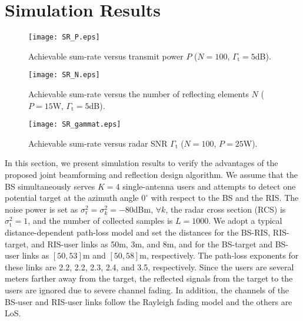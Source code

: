 \documentclass[Conference,a4paper]{IEEEtran}
\begin{document}
\section{Simulation Results}


\begin{figure*}[!t]
\centering
\begin{minipage}[t]{0.325\textwidth}\centering\setcaptionwidth{2in}
\texttt{[image: SR\_P.eps]}
\caption{Achievable sum-rate versus transmit power $P$ ($N = 100$, $\Gamma_\text{t}=5$dB).}
\end{minipage}
\begin{minipage}[t]{0.325\textwidth}
\texttt{[image: SR\_N.eps]}\centering\setcaptionwidth{2in}
\caption{Achievable sum-rate versus the number of reflecting elements $N$ ($P = 15$W, $\Gamma_\text{t} = 5$dB).}
\end{minipage}
\begin{minipage}[t]{0.325\textwidth}\centering\setcaptionwidth{2in}
\texttt{[image: SR\_gammat.eps]}
\caption{Achievable sum-rate versus radar SNR $\Gamma_\text{t}$ ($N = 100$, $P = 25$W).}
\end{minipage}\vspace{0.1 cm}
\end{figure*}


In this section, we present simulation results to verify the advantages of the proposed joint beamforming and reflection design algorithm.
We assume that the BS simultaneously serves $K = 4$ single-antenna users and attempts to detect one potential target at the azimuth angle $0^\circ$ with respect to the BS and the RIS.
The noise power is set as $\sigma_\text{r}^2 = \sigma_k^2 = -80$dBm, $\forall k$, the radar cross section (RCS) is $\sigma_\text{t}^2 = 1$, and the number of collected samples is $L = 1000$.
We adopt a typical distance-dependent path-loss model \cite{Wu-TWC-2019} and set the distances for the BS-RIS, RIS-target, and RIS-user links as 50m, 3m, and 8m, and for the BS-target and BS-user links as $[50,53]$m and $[50,58]$m, respectively.
The path-loss exponents for these links are 2.2, 2.2, 2.3, 2.4, and 3.5, respectively.
Since the users are several meters farther away from the target, the reflected signals from the target to the users are ignored due to severe channel fading.
In addition, the channels of the BS-user and RIS-user links follow the Rayleigh fading model and the others are LoS.
\end{document}
